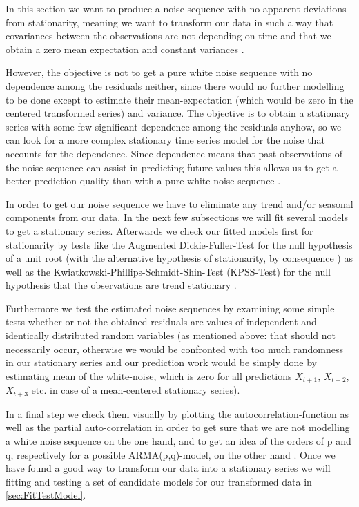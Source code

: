 \documentclass[11pt,a4paper]{article}
\begin{document}
In this section we want to produce a noise sequence with no apparent deviations from stationarity, meaning we want to transform our data in such a way that covariances between the observations are not depending on time and that we obtain a zero mean expectation and constant variances \cite[pp.~14--23]{bd02}.

However, the objective is not to get a pure white noise sequence  with no dependence among the residuals neither, since there would no further modelling to be done except to estimate their mean-expectation (which would be zero in the centered transformed series) and variance.
The objective is to obtain a stationary series with some few significant dependence among the residuals anyhow, so we can look for a more complex stationary time series model for the noise that accounts for the dependence.
Since dependence means that past observations of the noise sequence can assist in predicting future values this allows us to get a better prediction quality than with a pure white noise sequence \cite[p.~35]{bd02}.

In order to get our noise sequence we have to eliminate any trend and/or seasonal components from our data.
In the next few subsections we will fit several models to get a stationary series.
Afterwards we check our fitted models first for stationarity by tests like the Augmented Dickie-Fuller-Test for the null hypothesis of a unit root (with the alternative hypothesis of stationarity, by consequence \citep{adf}) as well as the Kwiatkowski-Phillips-Schmidt-Shin-Test (KPSS-Test) for the null hypothesis that the observations are trend stationary \citep{kpss92}.

Furthermore we test the estimated noise sequences by examining some simple tests whether or not the obtained residuals are values of independent and identically distributed random variables (as mentioned above: that should not necessarily occur, otherwise we would be confronted with too much randomness in our stationary series and our prediction work would be simply done by estimating mean of the white-noise, which is zero for all predictions $X_{t+1}$, $X_{t+2}$, $X_{t+3}$ etc. in case of a mean-centered stationary series).

In a final step we check them visually by plotting the autocorrelation-function as well as the partial auto-correlation in order to get sure that we are not modelling a white noise sequence on the one hand, and to get an idea of the orders of p and q, respectively for a possible ARMA(p,q)-model, on the other hand \cite[pp.~83--110]{bd02}.
Once we have found a good way to transform our data into a stationary series we will fitting and testing a set of candidate models for our transformed data in \cref{sec:FitTestModel}.
\end{document}
